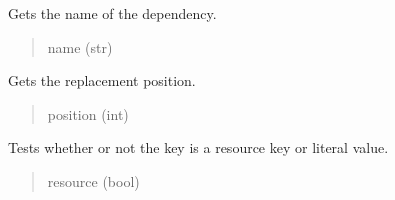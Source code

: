 \documentclass[letterpaper,10pt,english]{sphinxmanual}
\begin{document}
\begin{fulllineitems}
\begin{fulllineitems}
\label{\detokenize{apache_commons_validator_python:id3}}
\pysigstartsignatures
{}
\pysigstopsignatures
\sphinxAtStartPar
Gets the name of the dependency.
\begin{quote}\begin{description}
\sphinxAtStartPar
name (str)

\end{description}\end{quote}

\end{fulllineitems}


\begin{fulllineitems}
\label{\detokenize{apache_commons_validator_python:id4}}
\pysigstartsignatures
{}
\pysigstopsignatures
\sphinxAtStartPar
Gets the replacement position.
\begin{quote}\begin{description}
\sphinxAtStartPar
position (int)

\end{description}\end{quote}

\end{fulllineitems}


\begin{fulllineitems}
\label{\detokenize{apache_commons_validator_python:id5}}
\pysigstartsignatures
{}
\pysigstopsignatures
\sphinxAtStartPar
Tests whether or not the key is a resource key or literal value.
\begin{quote}\begin{description}
\sphinxAtStartPar
resource (bool)


\end{description}
\end{quote}
\end{fulllineitems}
\end{fulllineitems}
\end{document}
